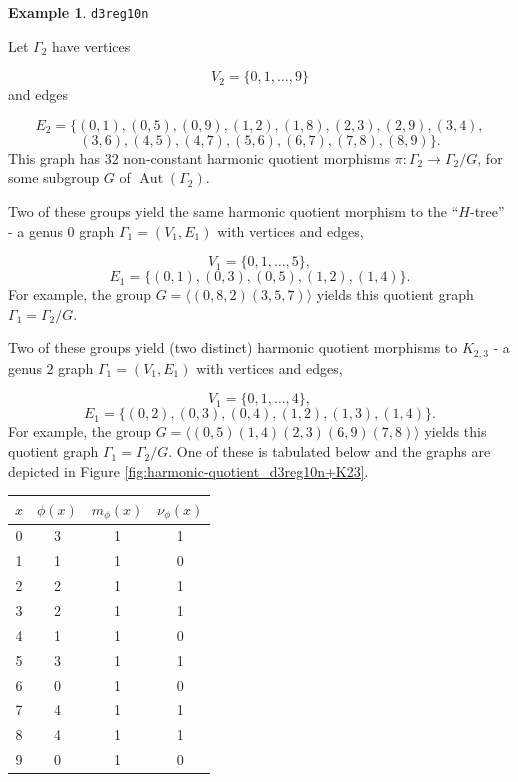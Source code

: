 \documentclass[12pt,letterpaper]{article}
\theoremstyle{definition}
\newtheorem{example}[theorem]{Example}
\DeclareMathOperator{\Aut}{Aut}
\begin{document}
\begin{example}%
\label{example:d3reg10n}
  {\tt d3reg10n}\newline
{\rm  
Let $\Gamma_2$ have vertices

\[
V_2=\{0,1,\dots,9\}
\]
and edges

\[
E_2 = \{
(0, 1), (0, 5), (0, 9), (1, 2), (1, 8), (2, 3), (2, 9), (3, 4),
\]
\[
(3, 6), (4, 5), (4, 7), (5, 6), (6, 7), (7, 8), (8, 9)
\}.
\]
This graph has $32$ non-constant harmonic quotient
morphisms $\pi: \Gamma_2\to \Gamma_2/G$, for some subgroup
$G$ of $\Aut(\Gamma_2)$.

Two of these groups yield the same harmonic quotient morphism to
the ``$H$-tree'' - a genus $0$ graph $\Gamma_1 = (V_1,E_1)$
with vertices and edges,

\[
V_1=\{0,1,\dots, 5\},
\]
\[
E_1=\{
(0, 1), (0, 3), (0, 5), (1, 2), (1, 4)
\}.
\]
For example, the group $G=\langle (0,8,2)(3,5,7) \rangle$
yields this quotient graph $\Gamma_1=\Gamma_2/G$.

Two of these groups yield (two distinct) harmonic quotient morphisms to
$K_{2,3}$ - a genus $2$ graph $\Gamma_1 = (V_1,E_1)$
with vertices and edges,

\[
V_1=\{0,1,\dots, 4\},
\]
\[
E_1=\{
(0, 2), (0, 3), (0, 4), (1, 2), (1, 3), (1, 4)
\}.
\]
For example, the group $G=\langle (0,5)(1,4)(2,3)(6,9)(7,8) \rangle$
yields this quotient graph $\Gamma_1=\Gamma_2/G$.
One of these is tabulated below and the graphs are
depicted in Figure \ref{fig:harmonic-quotient_d3reg10n+K23}.
\begin{center}
\begin{tabular}{c|c|c|c}  
  $x$ & $\phi(x)$ & $m_\phi(x)$ & $\nu_\phi(x)$ \\ \hline
  0   &    3   &        1         &  1   \\ 
  1   &    1   &        1         &  0   \\ 
  2   &    2   &        1         &  1   \\ 
  3   &    2   &        1         &  1   \\ 
  4   &    1   &        1         &  0   \\ 
  5   &    3   &        1         &  1    \\ 
  6   &    0   &        1         &  0   \\ 
  7   &    4   &        1         &  1   \\
  8   &    4   &        1         &  1   \\
  9   &    0   &        1         &  0   \\ 
\end{tabular}
\end{center}

}
\end{example}
\end{document}

